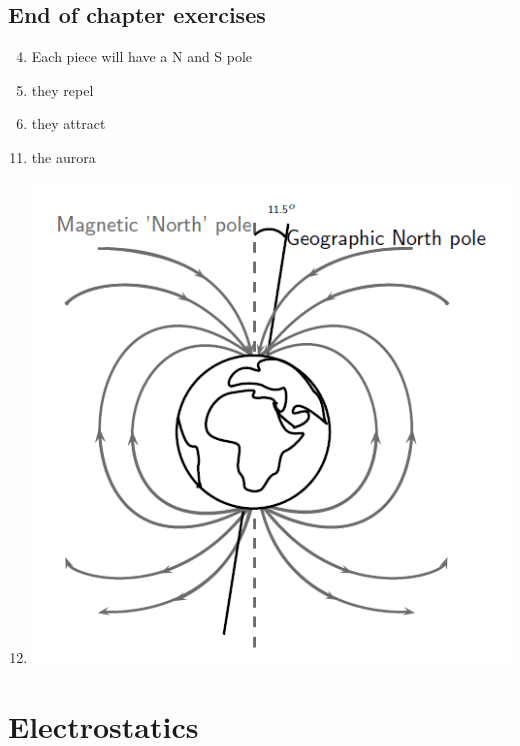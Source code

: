 \subsection{End of chapter exercises}
\begin{multicols}{2}
 \begin{enumerate}[noitemsep, label=\textbf{(\arabic*)} ]
\setcounter{enumi}{3}
\item Each piece will have a N and S pole
\item they repel
\item they attract
\end{enumerate}
 \begin{enumerate}[noitemsep, label=\textbf{(\arabic*)} ]
\setcounter{enumi}{10}
\item the aurora
\item \includegraphics[width=.2\textwidth]{photos/magnetism_earthsfield.png}
 \end{enumerate}
\end{multicols}

\section{Electrostatics}
